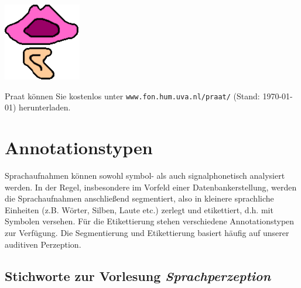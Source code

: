\documentclass[11pt]{book}
\begin{document}
\begin {minipage} {0.1\textwidth}
\includegraphics[width=\textwidth]{grafiken/sprachaufnahme/praat.png}
\end{minipage}
\hspace {1cm}
\begin{minipage} {0.7\textwidth}
Praat können Sie kostenlos unter {\tt www.fon.hum.uva.nl/praat/} (Stand: \today) herunterladen. 
\end {minipage}



\chapter{Annotationstypen}

Sprachaufnahmen können sowohl symbol- als auch signalphonetisch analysiert werden. In der Regel, insbesondere im Vorfeld einer Datenbankerstellung, werden die Sprachaufnahmen anschließend segmentiert, also in kleinere sprachliche Einheiten (z.\thinspace B. Wörter, Silben, Laute etc.) zerlegt und etikettiert, d.\thinspace h. mit Symbolen versehen. Für die Etikettierung stehen verschiedene Annotationstypen zur Verfügung. Die Segmentierung und Etikettierung basiert häufig auf unserer auditiven Perzeption.

\section{Stichworte zur Vorlesung \em{Sprachperzeption}}
\end{document}
